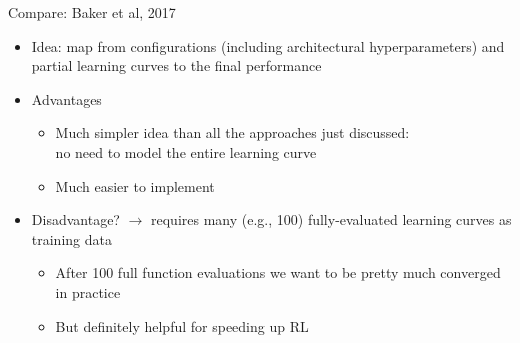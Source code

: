 \begin{frame}{Compare: Baker et al, 2017 }

	\begin{itemize}
		\item Idea: map from configurations (including architectural hyperparameters) 
		and partial learning curves to the final performance

		\item Advantages
		\begin{itemize}
			\item \alert{Much simpler idea} than all the approaches just discussed:\\ no need to model the entire learning curve
			\item \alert{Much easier to implement}
		\end{itemize}
		\item Disadvantage? \pause
		\alert{$\rightarrow$ requires many (e.g., 100) fully-evaluated learning curves as training data}
		\begin{itemize}
			\item After 100 full function evaluations we want to be pretty much converged in practice
			\item But definitely helpful for speeding up RL
			
		\end{itemize}
	\end{itemize}

\end{frame}

